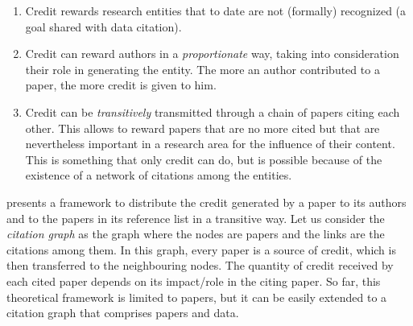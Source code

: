 \begin{enumerate}
\item Credit rewards research entities that to date are not (formally) recognized (a goal shared with data citation).
\item Credit can reward authors in a \emph{proportionate} way, taking into consideration their role in generating the entity. The more an author contributed to a paper, the more credit is given to him.
\item Credit can be \emph{transitively} transmitted through a chain of papers citing each other. This allows to reward papers that are no more cited but that are nevertheless important in a research area for the influence of their content.
This is something that only credit can do, but is possible because of the existence of a network of citations among the entities.
\end{enumerate}


\citep{creditFang18} presents a framework to distribute the credit generated by a paper to its authors and to the papers in its reference list in a transitive way. 
Let us consider the \emph{citation graph} as the graph where the nodes are papers and the links are the citations among them.
In this graph, every paper is a source of credit, which is then transferred to the neighbouring nodes.
The quantity of credit received by each cited paper depends on its impact/role in the citing paper. 
So far, this theoretical framework is limited to papers, but it can be easily extended to a citation graph that comprises papers and data. 

